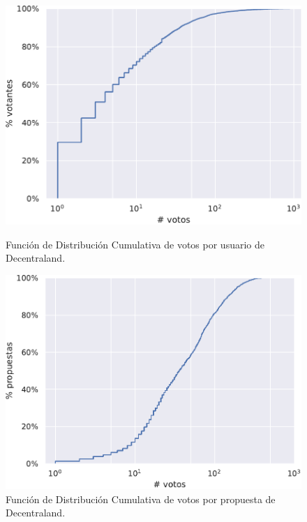 \begin{figure}[t]
    \begin{minipage}{.48\linewidth}
        \centering
        \includegraphics[width=\linewidth]{figures/04_exploracion/04_hybrid_ecdf_voters_Decentraland.pdf}
        \caption[Función de Dist. Cum. de votos por usuario de Decentraland.]{Función de Distribución Cumulativa de votos por usuario de Decentraland.}
        \label{fig:04-ecdf-voters}
    \end{minipage}\hfill\begin{minipage}{.48\linewidth}
        \centering
        \includegraphics[width=\linewidth]{figures/04_exploracion/04_hybrid_ecdf_proposals_Decentraland.pdf}
        \caption[Función de Dist. Cum. de votos por propuesta de Decentraland.]{Función de Distribución Cumulativa de votos por propuesta de Decentraland.}
        \label{fig:04-ecdg-proposals}
    \end{minipage}
\end{figure}

